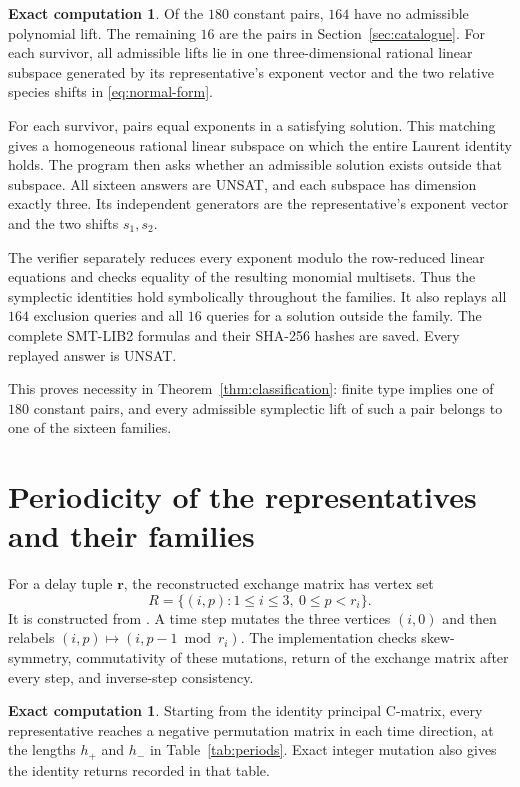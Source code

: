 \documentclass[11pt,a4paper]{article}
\theoremstyle{definition}
\newtheorem{computation}[theorem]{Exact computation}
\newcommand{\code}[1]{\texttt{\detokenize{#1}}}
\begin{document}
\begin{computation}\label{comp:lifts}
Of the $180$ constant pairs, $164$ have no admissible polynomial lift.
The remaining $16$ are the pairs in Section~\ref{sec:catalogue}. For each
survivor, all admissible lifts lie in one three-dimensional rational linear
subspace generated by its representative's exponent vector and the two
relative species shifts in \eqref{eq:normal-form}.
\end{computation}

For each survivor, \code{classify_lift_spaces.py} pairs equal exponents
in a satisfying solution. This matching gives a homogeneous rational
linear subspace on which the entire Laurent identity holds. The program
then asks whether an admissible solution exists outside that subspace.
All sixteen answers are UNSAT, and each subspace has dimension exactly
three. Its independent generators are the representative's exponent
vector and the two shifts $s_1,s_2$.

The verifier separately reduces every exponent modulo the row-reduced
linear equations and checks equality of the resulting monomial multisets.
Thus the symplectic identities hold symbolically throughout the families.
It also replays all $164$ exclusion queries and all $16$ queries for a
solution outside the family. The complete SMT-LIB2 formulas and their
SHA-256 hashes are saved. Every replayed answer is UNSAT.

This proves necessity in Theorem~\ref{thm:classification}: finite type
implies one of $180$ constant pairs, and every admissible symplectic lift
of such a pair belongs to one of the sixteen families.

\section{Periodicity of the representatives and their families}\label{sec:periodicity}

For a delay tuple $\symbf{r}$, the reconstructed exchange matrix has
vertex set
\[
 R=\{(i,p):1\le i\le3,\ 0\le p<r_i\}.
\]
It is constructed from \cite[equation (2.2)]{MizunoRankTwo}. A time step
mutates the three vertices $(i,0)$ and then relabels
$(i,p)\mapsto(i,p-1\bmod r_i)$. The implementation checks skew-symmetry,
commutativity of these mutations, return of the exchange matrix after
every step, and inverse-step consistency.

\begin{computation}\label{comp:reddening}
Starting from the identity principal C-matrix, every representative
reaches a negative permutation matrix in each time direction, at the
lengths $h_+$ and $h_-$ in Table~\ref{tab:periods}. Exact integer mutation
also gives the identity returns recorded in that table.
\end{computation}
\end{document}
